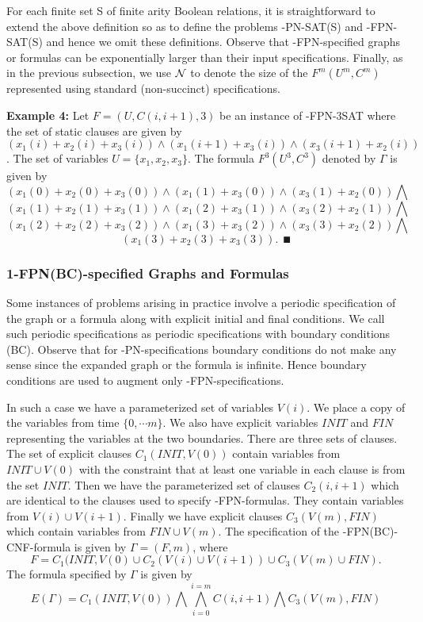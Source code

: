 For each finite set {\sf S} of finite arity Boolean relations, 
it is straightforward to extend the above 
definition so as to define the problems {-PN-SAT(S)}  
and {-FPN-SAT(S)}  and  hence we omit these
definitions.  Observe that 
{-FPN}-specified graphs or formulas can be exponentially larger 
than their input specifications. Finally, as in the previous subsection, 
we use ${\cal N}$ to denote the size of the $F^m(U^m, C^m)$ represented
using standard (non-succinct) specifications.


	 
\noindent
{\bf Example 4:}
Let $F= (U,C(i, i+1),3)$ be an instance of  {-FPN-3SAT} 
where the set of static clauses are given by
$(x_1(i) + x_2(i) + x_3(i) )  \wedge 
(x_1(i+1) + x_3(i)) \wedge (x_3(i+1) + x_2(i))$.
The set of variables $U = \{ x_1, x_2, x_3 \}$.
The formula $F^3(U^3,C^3)$ denoted by $\Gamma$ is given by 
\[(x_1(0) + x_2(0) + x_3(0)) \wedge (x_1(1) + x_3(0)) \wedge (x_3(1) + x_2(0)) 
\bigwedge \]
\[(x_1(1) + x_2(1) + x_3(1)) \wedge (x_1(2) + x_3(1)) \wedge (x_3(2) + x_2(1)) 
\bigwedge \]
\[(x_1(2) + x_2(2) + x_3(2)) \wedge (x_1(3) + x_3(2)) \wedge (x_3(3) + x_2(2)) 
\bigwedge \]
\[(x_1(3) + x_2(3) + x_3(3)). ~~\QED\]



\vspace*{-0.15in}
\subsubsection{1-FPN(BC)-specified Graphs and Formulas}
Some instances of problems arising in practice involve a periodic specification
of the graph or a formula along with explicit initial and final conditions.
We call such periodic specifications as periodic specifications with boundary
conditions ({\sf BC}). 
Observe that for {-PN}-specifications boundary conditions
do not make any sense since the expanded graph or the formula is infinite.
Hence boundary conditions are used to augment only {-FPN}-specifications.

In such a case we have a parameterized set of variables $V(i)$.
We place a copy of the variables from time $\{ 0, \cdots m \}$.
We also have explicit variables $INIT$ and $FIN$ 
representing the variables at the
two boundaries. There are three sets of clauses.
The set of explicit clauses $C_1(INIT, V(0))$ contain variables from 
$INIT \cup V(0)$  with the constraint that at least one variable in each clause
is from the set $INIT$. Then we have the parameterized set of clauses
$C_2(i, i+1)$ which are identical to the clauses used to specify 
{-FPN}-formulas. They contain variables from $V(i) \cup V(i+1)$.
Finally we have explicit clauses $C_3(V(m), FIN)$ which contain variables from
$FIN \cup V(m)$. 
The specification of the {-FPN(BC)-CNF}-formula is given by
$\Gamma = ( F, m)$, where 
\[F = C_1(INIT, V(0) \cup C_2(V(i) \cup V(i+1)) \cup C_3(V(m) \cup FIN). \]
The formula specified by $\Gamma$ is given by 
\[E(\Gamma) =  
C_1(INIT, V(0)) \bigwedge \bigwedge_{i = 0}^{ i = m} C(i, i+1) \bigwedge 
C_3(V(m), FIN)   \]
